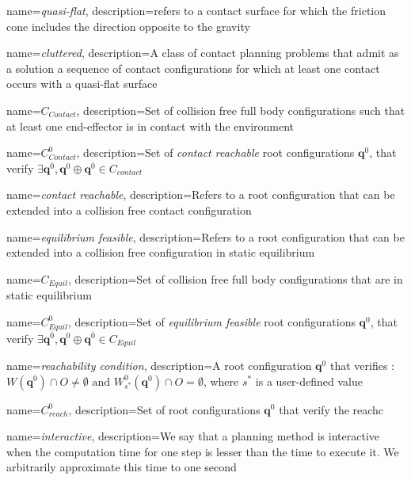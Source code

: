 {
  name=\textit{quasi-flat},
  description={refers to a contact surface for which the friction cone includes the direction opposite to the gravity}
}

{
  name=\textit{cluttered},
  description={A class of contact planning problems that admit as a solution a sequence of contact configurations for which at least one contact occurs with a \gls{quasi-flat} surface}
}

{
  name=$C_{Contact}$,
  description={Set of collision free full body configurations such that at least one end-effector is in contact with the environment}
}

{
  name=$C_{Contact}^0$,
  description={Set of \textit{contact reachable} root configurations $\mathbf{q}^{0}$, that verify $\exists \mathbf{q}^{\overline{0}},  \mathbf{q}^{0} \oplus \mathbf{q}^{\overline{0}} \in C_{contact}$}
}

{
  name=\textit{contact reachable},
  description={Refers to a root configuration that can be extended into a collision free contact configuration}
}

{
  name=\textit{equilibrium feasible},
  description={Refers to a root configuration that can be extended into a collision free configuration in static equilibrium}
}


{
  name=$C_{Equil}$,
  description={Set of collision free full body configurations that are in static equilibrium}
}

{
  name=$C_{Equil}^0$,
  description={Set of \textit{equilibrium feasible} root configurations $\mathbf{q}^{0}$, that verify $\exists \mathbf{q}^{\overline{0}},  \mathbf{q}^{0} \oplus \mathbf{q}^{\overline{0}} \in C_{Equil}$}
}

{
  name=\textit{reachability condition},
  description={A root configuration $\mathbf{q}^{0}$ that verifies :\\ $W(\mathbf{q}^{0}) \cap O \neq \emptyset \text{ and } W^0_{s^*}(\mathbf{q}^{0}) \cap O = \emptyset$,
  where $s^*$ is a user-defined value}
}

{
  name=$C_{reach}^0$,
  description={Set of root configurations  $\mathbf{q}^{0}$ that verify the \gls{reachc}}
}

{
  name=\textit{interactive},
  description={We say that a planning method is interactive when the computation time for one step is lesser than the
time to execute it. We arbitrarily approximate this time to one second}
}
